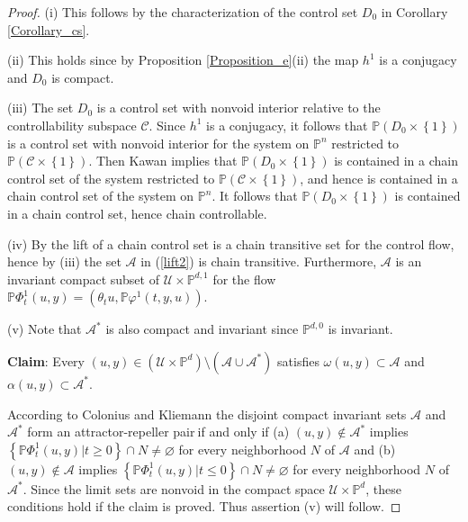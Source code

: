 \documentclass{siamltex}%
\begin{document}
\begin{proof}
(i) This follows by the characterization of the control set $D_{0}$ in
Corollary \ref{Corollary_cs}.

(ii) This holds since by Proposition \ref{Proposition_e}(ii) the map $h^{1}$
is a conjugacy and $D_{0}$ is compact.

(iii) The set $D_{0}$ is a control set with nonvoid interior relative to the
controllability subspace $\mathcal{C}$. Since $h^{1}$ is a conjugacy, it
follows that $\mathbb{P}(D_{0}\times\left\{  1\right\}  )$ is a control set
with nonvoid interior for the system on $\mathbb{P}^{n}$ restricted to
$\mathbb{P}(\mathcal{C}\times\left\{  1\right\}  )$. Then Kawan
\cite[Proposition 1.24(ii)]{Kawan13} implies that $\mathbb{P}(D_{0}%
\times\left\{  1\right\}  )$ is contained in a chain control set of the system
restricted to $\mathbb{P}(\mathcal{C}\times\left\{  1\right\}  )$, and hence
is contained in a chain control set of the system on $\mathbb{P}^{n}$. It
follows that $\mathbb{P}(D_{0}\times\left\{  1\right\}  )$ is contained in a
chain control set, hence chain controllable.

(iv) By \cite[Proposition 1.24(iv)]{Kawan13} the lift of a chain control set
is a chain transitive set for the control flow, hence by (iii) the set
$\mathcal{A}$ in (\ref{lift2}) is chain transitive. Furthermore, $\mathcal{A}$
is an invariant compact subset of $\mathcal{U}\times\mathbb{P}^{d,1}$ for the
flow $\mathbb{P}\Phi_{t}^{1}(u,y)=(\theta_{t}u,\mathbb{P}\varphi^{1}(t,y,u))$.

(v) Note that $\mathcal{A}^{\ast}$ is also compact and invariant since
$\mathbb{P}^{d,0}$ is invariant.

\textbf{Claim}: Every $(u,y)\in(\mathcal{U}\times\mathbb{P}^{d})\setminus
(\mathcal{A}\cup\mathcal{A}^{\ast})$ satisfies $\omega(u,y)\subset\mathcal{A}$
and $\alpha(u,y)\subset\mathcal{A}^{\ast}$.

According to Colonius and Kliemann \cite[Lemma B.2.14]{ColK00} the disjoint
compact invariant sets $\mathcal{A}$ and $\mathcal{A}^{\ast}$ form an
attractor-repeller pair$\ $if and only if (a) $(u,y)\not \in \mathcal{A}%
^{\ast}$ implies $\left\{  \mathbb{P}\Phi_{t}^{1}(u,y)\left\vert
t\geq0\right.  \right\}  \cap N\not =\varnothing$ for every neighborhood $N$
of $\mathcal{A}$ and (b) $(u,y)\not \in \mathcal{A}$ implies $\left\{
\mathbb{P}\Phi_{t}^{1}(u,y)\left\vert t\leq0\right.  \right\}  \cap
N\not =\varnothing$ for every neighborhood $N$ of $\mathcal{A}^{\ast}$. Since
the limit sets are nonvoid in the compact space $\mathcal{U}\times
\mathbb{P}^{d}$, these conditions hold if the claim is proved. Thus assertion
(v) will follow.


\end{proof}
\end{document}
